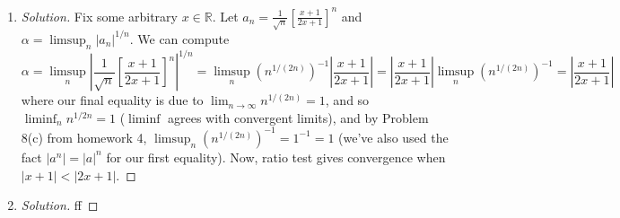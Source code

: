 \documentclass{article}
\newcommand{\R}{{\mathbb R}}
\begin{document}
\begin{enumerate}
\begin{proof}[Solution]
		It remains to consider the case when $-1 < x < 0$.
		Now if $n$ is odd, we have $a_n = \frac{(-1)|x|^n(1+|x|^n)}{n}
		< \frac{-2|x|^n}{n}$.
		Since $\lim_{n\to\infty}\frac{2n}{(1/|x|)^n} = 0$ by Rudin Theorem 3.20 (d),
		we have some $N$ such that $\left(\frac{1}{|x|}\right)^n > 2n > 0$
		for all $n \geq N$,
		thus $0 < 2|x|^n < \frac{1}{n}$,
		thus $|a_n| < \frac{2|x|^n}{n} < \frac{1}{n^2}$.
		Furthermore, when $n$ is even, we have $a_n = \frac{|x|^n(1-|x|^n)}{n} < \frac{|x|^n(1 + |x|^n)}{n} < \frac{1}{n^2}$ as well.
		Thus $|a_n| < \frac{1}{n^2}$ for all $n \geq N$.
		And since $\sum_n \frac{1}{n^2}$ is a convergent $p$-series ($p > 1$),
		the comparison test tells us that $\sum_n a_n$ converges as wel.

		In summary: the series converges when $x \in (-1,1]$,
		and diverges otherwise.
	\end{proof}
	\item \begin{proof}[Solution]\let\qed\relax
		Fix some arbitrary $x \in \R$.
		Let $a_n = \frac{1}{\sqrt{n}}\left[\frac{x+1}{2x+1}\right]^n$
		and $\alpha = \limsup_n|a_n|^{1/n}$.
		We can compute
		\[
			\alpha =
			\limsup_n \left\lvert\frac{1}{\sqrt{n}}
			\left[\frac{x+1}{2x+1}\right]^n\right\rvert^{1/n}
			= \limsup_n (n^{1/(2n)})^{-1}\left\lvert\frac{x+1}{2x+1}\right\rvert
			= \left\lvert\frac{x+1}{2x+1}\right\rvert\limsup_n(n^{1/(2n)})^{-1}
			=\left\lvert\frac{x+1}{2x+1}\right\rvert
		\]
		where our final equality is due to $\lim_{n\to\infty} n^{1/(2n)} = 1$,
		and so $\liminf_n n^{1/{2n}} = 1$ ($\liminf$ agrees with convergent limits),
		and by Problem 8(c) from homework 4,
		$\limsup_n (n^{1/(2n)})^{-1} = 1^{-1} = 1$
		(we've also used the fact $|a^n| = |a|^n$ for our first equality).
		Now, ratio test gives convergence when $|x+1| < |2x+1|$.
	\end{proof}
	\item \begin{proof}[Solution]\let\qed\relax
		ff
	\end{proof}
\end{enumerate}
\clearpage
\end{document}
